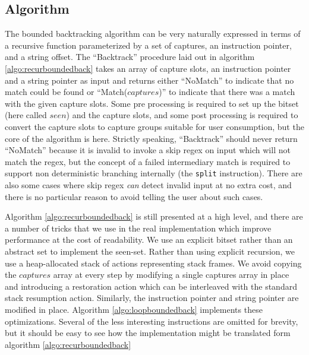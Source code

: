 \subsection{Algorithm}

The bounded backtracking algorithm can be very naturally expressed
in terms of a recursive function parameterized by a set of captures,
an instruction pointer, and a string offset.  The ``Backtrack'' procedure
laid out in algorithm \ref{algo:recurboundedback} takes an array of capture
slots, an instruction pointer and a string pointer as input and returns
either ``NoMatch'' to indicate that no match could be found
or ``Match($captures$)'' to indicate that there was a match with the
given capture slots. Some pre processing is required to
set up the bitset (here called $seen$) and the capture slots,
and some post processing is required to convert the capture slots
to capture groups suitable for user consumption, but the core
of the algorithm is here. Strictly speaking, ``Backtrack'' should
never return ``NoMatch'' because it is invalid to invoke a skip
regex on input which will not match the regex, but the concept of
a failed intermediary match is required to support non deterministic
branching internally (the \verb'split' instruction). There are also
some cases where skip regex \emph{can} detect invalid input at no
extra cost, and there is no particular reason to avoid telling the
user about such cases.

Algorithm \ref{algo:recurboundedback} is still presented at a
high level, and there are a number of tricks that we use in the
real implementation which improve performance at the cost of
readability. We use an explicit bitset rather than an abstract
set to implement the seen-set. Rather than using explicit recursion,
we use a heap-allocated stack of actions representing stack frames.
We avoid copying the $captures$ array at every step by modifying
a single captures array in place and introducing a restoration action
which can be interleaved with the standard stack resumption action.
Similarly, the instruction pointer and string pointer are modified
in place. Algorithm \ref{algo:loopboundedback} implements these
optimizations. Several of the less interesting instructions are
omitted for brevity, but it should be easy to see how the implementation
might be translated form algorithm \ref{algo:recurboundedback}

